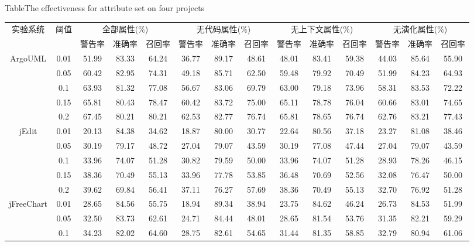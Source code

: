 \begin{sidewaystable} 
{Table$\!$}{The effectiveness for attribute set on four projects}
\vspace{0.5em}
\centering
\wuhao
\begin{tabular}{cccccccccccccc}
\toprule[1.5pt]
\multirow{2}{*}{实验系统}&\multirow{2}{*}{阈值}&\multicolumn{3}{c}{全部属性(\%)}&\multicolumn{3}{c}{无代码属性(\%)}&\multicolumn{3}{c}{无上下文属性(\%)}&\multicolumn{3}{c}{无演化属性(\%)}\\
\cline{3-14}
&&{警告率}&{准确率}&{召回率}&{警告率}&{准确率}&{召回率}&{警告率}&{准确率}&{召回率}&{警告率}&{准确率}&{召回率}\\
\midrule[1pt]
\multirow{5}{*}{ArgoUML}
&0.01&	51.99&	83.33&	64.24&	36.77&	89.17&	48.61&	48.01&	83.41&	59.38&	44.03&	85.64&	55.90\\
&0.05&	60.42&	82.95&	74.31&	49.18&	85.71&	62.50&	59.48&	79.92&	70.49&	51.99&	84.23&	64.93\\
&0.1&	63.93&	81.32&	77.08&	56.67&	83.06&	69.79&	63.00&	79.18&	73.96&	58.31&	83.53&	72.22\\
&0.15&	65.81&	80.43&	78.47&	60.42&	83.72&	75.00&	65.11&	78.78&	76.04&	60.66&	83.01&	74.65\\
&0.2&	67.45&	80.21&	80.21&	62.53&	82.77&	76.74&	65.81&	78.65&	76.74&	62.76&	83.21&	77.43\\
\hline
\multirow{5}{*}{jEdit}
&0.01&	20.13&	84.38&	34.62&	18.87&	80.00&	30.77&	22.64&	80.56&	37.18&	23.27&	81.08&	38.46\\
&0.05&	30.19&	79.17&	48.72&	27.04&	79.07&	43.59&	30.19&	77.08&	47.44&	27.04&	79.07&	43.59\\
&0.1&	33.96&	74.07&	51.28&	30.82&	79.59&	50.00&	33.96&	74.07&	51.28&	28.93&	78.26&	46.15\\
&0.15&	38.36&	70.49&	55.13&	33.96&	77.78&	53.85&	36.48&	70.69&	52.56&	32.08&	76.47&	50.00\\
&0.2&	39.62&	69.84&	56.41&	37.11&	76.27&	57.69&	38.36&	70.49&	55.13&	32.70&	76.92&	51.28\\
\hline
\multirow{5}{*}{jFreeChart}
&0.01& 28.65&	84.56&	55.75&	18.94&	89.34&	38.94&	23.75&	84.62&	46.24&	26.73&	84.53&	51.99\\
&0.05&	32.50&	83.73&	62.61&	24.71&	84.44&	48.01&	28.65&	81.54&	53.76&	31.35&	82.21&	59.29\\
&0.1&	34.23&	82.02&	64.60&	28.75&	82.61&	54.65&	31.44&	81.35&	58.85&	32.79&	80.94&	61.06\\

\end{tabular}
\end{sidewaystable}
